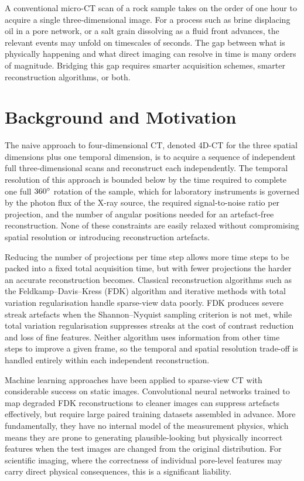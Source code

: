 \documentclass[12pt, a4paper, twoside]{report}
\begin{document}
A conventional micro-CT scan of a rock sample takes on the order of one hour to acquire a single three-dimensional image. For a process such as brine displacing oil in a pore network, or a salt grain dissolving as a fluid front advances, the relevant events may unfold on timescales of seconds. The gap between what is physically happening and what direct imaging can resolve in time is many orders of magnitude. Bridging this gap requires smarter acquisition schemes, smarter reconstruction algorithms, or both.

\section{Background and Motivation}
\label{sec:intro_background}

The naive approach to four-dimensional CT, denoted 4D-CT for the three spatial dimensions plus one temporal dimension, is to acquire a sequence of independent full three-dimensional scans and reconstruct each independently. The temporal resolution of this approach is bounded below by the time required to complete one full $360\degree$ rotation of the sample, which for laboratory instruments is governed by the photon flux of the X-ray source, the required signal-to-noise ratio per projection, and the number of angular positions needed for an artefact-free reconstruction. None of these constraints are easily relaxed without compromising spatial resolution or introducing reconstruction artefacts.

Reducing the number of projections per time step allows more time steps to be packed into a fixed total acquisition time, but with fewer projections the harder an accurate reconstruction becomes. Classical reconstruction algorithms such as the Feldkamp--Davis--Kress (FDK) algorithm and iterative methods with total variation regularisation handle sparse-view data poorly. FDK produces severe streak artefacts when the Shannon--Nyquist sampling criterion is not met, while total variation regularisation suppresses streaks at the cost of contrast reduction and loss of fine features. Neither algorithm uses information from other time steps to improve a given frame, so the temporal and spatial resolution trade-off is handled entirely within each independent reconstruction.

Machine learning approaches have been applied to sparse-view CT with considerable success on static images. Convolutional neural networks \citep{lecun1998gradient} trained to map degraded FDK reconstructions to cleaner images can suppress artefacts effectively, but require large paired training datasets assembled in advance. More fundamentally, they have no internal model of the measurement physics, which means they are prone to generating plausible-looking but physically incorrect features when the test images are changed from the original distribution. For scientific imaging, where the correctness of individual pore-level features may carry direct physical consequences, this is a significant liability.
\end{document}
